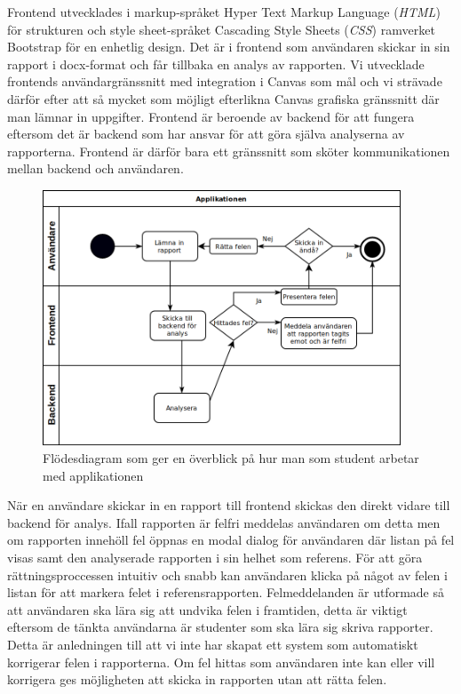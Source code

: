 \documentclass[swedish]{maucsthesis}
\begin{document}
Frontend utvecklades i markup-språket Hyper Text Markup Language (\textit{HTML}) för
strukturen och style sheet-språket Cascading Style Sheets (\textit{CSS}) ramverket
Bootstrap för en enhetlig design. Det är i frontend som användaren skickar in
sin rapport i docx-format och får tillbaka en analys av rapporten. Vi utvecklade
frontends användargränssnitt med integration i Canvas som mål och vi strävade
därför efter att så mycket som möjligt efterlikna Canvas grafiska gränssnitt
där man lämnar in uppgifter. Frontend är beroende av backend för att fungera
eftersom det är backend som har ansvar för att göra själva analyserna av
rapporterna. Frontend är därför bara ett gränssnitt som sköter kommunikationen
mellan backend och användaren.

\begin{figure}[H]
    \centering
    \includegraphics[width=0.95\textwidth]{overviewflow.png}
    \caption{Flödesdiagram som ger en överblick på hur man som student arbetar
      med applikationen}
    \label{fig:overviewflow}
\end{figure}

När en användare skickar in en rapport till frontend skickas den direkt vidare
till backend för analys. Ifall rapporten är felfri meddelas användaren om detta
men om rapporten innehöll fel öppnas en modal dialog för användaren där listan
på fel visas samt den analyserade rapporten i sin helhet som referens. För att
göra rättningsproccessen intuitiv och snabb kan användaren klicka på något av
felen i listan för att markera felet i referensrapporten. Felmeddelanden är
utformade så att användaren ska lära sig att undvika felen i framtiden, detta är
viktigt eftersom de tänkta användarna är studenter som ska lära sig skriva
rapporter. Detta är anledningen till att vi inte har skapat ett system som
automatiskt korrigerar felen i rapporterna. Om fel hittas som användaren inte
kan eller vill korrigera ges möjligheten att skicka in rapporten utan att rätta
felen.
\end{document}
